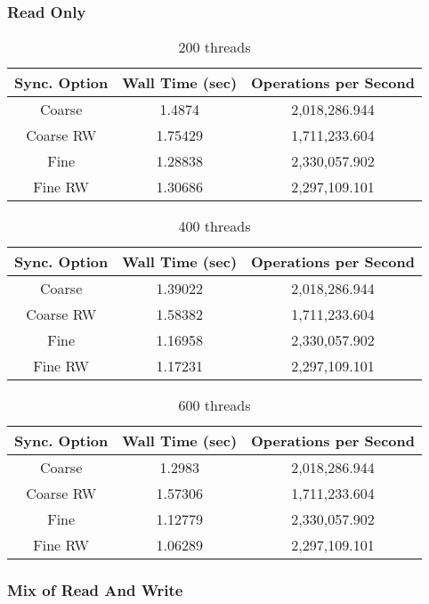 \documentclass[11pt]{article}
\begin{document}
\subsubsection{Read Only}
\begin{table}[H]
	\centering
	\begin{tabular}{|c|c|c|}
		\hline
		Sync. Option &Wall Time (sec)	&Operations per Second	\\
		\hline
		Coarse &1.4874	&2,018,286.944\\
		\hline
		Coarse RW &1.75429 &1,711,233.604\\
		\hline
		Fine	&1.28838	&2,330,057.902\\
		\hline
		Fine RW	&1.30686	&2,297,109.101\\
		\hline
	\end{tabular}
	\caption{200 threads}
\end{table}
\begin{table}[H]
	\centering
	\begin{tabular}{|c|c|c|}
		\hline
		Sync. Option &Wall Time (sec)	&Operations per Second	\\
		\hline
		Coarse &1.39022	&2,018,286.944\\
		\hline
		Coarse RW &1.58382 &1,711,233.604\\
		\hline
		Fine	&1.16958	&2,330,057.902\\
		\hline
		Fine RW	&1.17231	&2,297,109.101\\
		\hline
	\end{tabular}
	\caption{400 threads}
\end{table}
\begin{table}[H]
	\centering
	\begin{tabular}{|c|c|c|}
		\hline
		Sync. Option &Wall Time (sec)	&Operations per Second	\\
		\hline
		Coarse &1.2983	&2,018,286.944\\
		\hline
		Coarse RW &1.57306 &1,711,233.604\\
		\hline
		Fine	&1.12779	&2,330,057.902\\
		\hline
		Fine RW	&1.06289	&2,297,109.101\\
		\hline
	\end{tabular}
	\caption{600 threads}
\end{table}
\subsubsection{Mix of Read And Write}
\end{document}
